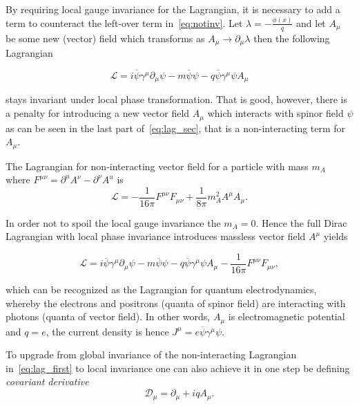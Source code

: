 By requiring local gauge invariance for the Lagrangian, it is necessary to add a term to counteract the left-over term in~\autoref{eq:notinv}. Let $\lambda=-\frac{\phi(x)}{q}$ and let $A_{\mu}$ be some new (vector) field which transforms as $A_{\mu} \rightarrow \partial_{\mu}\lambda$ then the following Lagrangian

\begin{equation}
	\mathcal{L} = i\overline{\psi}\gamma^{\mu}\partial_{\mu}\psi - m\overline{\psi}\psi - q\overline{\psi}\gamma^{\mu}\psi A_{\mu}
\label{eq:lag_sec}
\end{equation}

stays invariant under local phase transformation. That is good, however, there is a penalty for introducing a new vector field $A_{\mu}$ which interacts with spinor field $\psi$ as can be seen in the last part of~\autoref{eq:lag_sec}, that is a non-interacting term for $A_{\mu}$.

The Lagrangian for non-interacting vector field for a particle with mass $m_{A}$ where $F^{\mu\nu}=\partial^{u}A^{\nu} - \partial^{\nu}A^{u}$ is
\begin{equation}
\mathcal{L}= -\frac{1}{16\pi} F^{\mu\nu}F_{\mu\nu} + \frac{1}{8\pi}m_{A}^{2}A^{\mu}A_{\mu}.
\end{equation}

In order not to spoil the local gauge invariance the $m_{A}=0$. Hence the full Dirac Lagrangian with local phase invariance introduces massless vector field $A^{\mu}$ yields

\begin{equation}
	\mathcal{L} = i\overline{\psi}\gamma^{\mu}\partial_{\mu}\psi - m\overline{\psi}\psi - q\overline{\psi}\gamma^{\mu}\psi A_{\mu} -\frac{1}{16\pi} F^{\mu\nu}F_{\mu\nu},
\label{eq:lag_thir}
\end{equation}

which can be recognized as the Lagrangian for quantum electrodynamics, whereby the electrons and positrons (quanta of spinor field) are interacting with photons (quanta of vector field). In other words, $A_{\mu}$ is electromagnetic potential and $q=e$, the current density is hence $J^{\mu}=e\overline{\psi}\gamma^{\mu}\psi$.

To upgrade from global invariance of the non-interacting Lagrangian in~\autoref{eq:lag_first} to local invariance one can also achieve it in one step be defining \textit{covariant derivative}
\begin{equation}
	\mathcal{D}_{\mu} = \partial_{\mu}+ iqA_{\mu}.
\end{equation}


